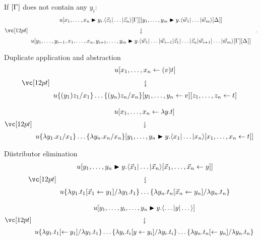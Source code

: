 \documentclass{amsart}
\begin{document}
\noindent
If $\G$ does not contain any $y_i$:
\[
\displayrewrite
  { u\diistr x{y_i}{\ttup*z\G}\diistr[m]yy{\ttup*[m]w\G*} }
  { u\diistr*{y_1,\dotsc,y_{i-1},\vv x, y_{i+1}, \dotsc, y_m} y {
  \tup*{\vv*w_1|\dotso|\vv*w_{i-1}|\vv*z_1|\dotso|\vv*z_n|\vv*w_{i+1}|\dotso|\vv*w_m}
  \G\G*} }\;.
\]

\bigskip
\bigskip
\bigskip

\noindent
Duplicate application and abstraction
\[
\displayrewrite
{ u\share x{(v)t} }
{ u\subsapp xyz\share yv\share zt }
\]

\bigskip

\[
\displayrewrite
  { u\share x{\lambda y.t} }
  { u\subsabs xyx\diistr yy{\ttup x\share xt} }
\]

\bigskip
\bigskip
\bigskip

\noindent
Diistributor elimination
\[
\displayrewrite
  { u\diistr yy{\ttup*x\share{\vv*x}y} }
  { u\sub{\lambda y_1.t_1}{\lambda y_1.t_1\share*{\vv*x_1}{y_1}} \dotso
     \sub{\lambda y_n.t_n}{\lambda y_n.t_n\share*{\vv*x_n}{y_n}} }
\]

\bigskip

\[
\displayrewrite
  { u\diistr*{y_1,\dotsc,y_i,\dotsc,y_n}y{\tup*{\dotso|y|\dotso}} }
  { u\sub{\lambda y_1.t_1}{\lambda y_1.t_1\share*{}{y_1}} \dotso
     \sub{\lambda y_i.t_i}{\lambda y_i.t_i\share*{y}{y_i}} \dotso
     \sub{\lambda y_n.t_n}{\lambda y_n.t_n\share*{}{y_n}} }
\]
\end{document}
